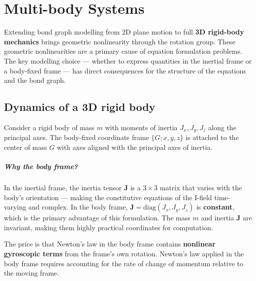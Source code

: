 \chapter{Multi-body Systems}
\label{ch:multibody}



Extending bond graph modelling from 2D plane motion to full \textbf{3D rigid-body mechanics} brings geometric nonlinearity through the rotation group. These geometric nonlinearities are a primary cause of equation formulation problems. The key modelling choice — whether to express quantities in the inertial frame or a body-fixed frame — has direct consequences for the structure of the equations and the bond graph.

\section{Dynamics of a 3D rigid body}

Consider a rigid body of mass $m$ with moments of inertia $J_x, J_y, J_z$ along the principal axes. The body-fixed coordinate frame $\{G; x, y, z\}$ is attached to the center of mass $G$ with axes aligned with the principal axes of inertia. 

\paragraph{Why the body frame?}
In the inertial frame, the inertia tensor $\mathbf{J}$ is a $3\times3$ matrix that varies with the body's orientation — making the constitutive equations of the I-field time-varying and complex. In the body frame, $\mathbf{J} = \mathrm{diag}(J_x, J_y, J_z)$ is \textbf{constant}, which is the primary advantage of this formulation. The mass $m$ and inertia $\mathbf{J}$ are invariant, making them highly practical coordinates for computation.

The price is that Newton's law in the body frame contains \textbf{nonlinear gyroscopic terms} from the frame's own rotation. Newton's law applied in the body frame requires accounting for the rate of change of momentum relative to the moving frame.

